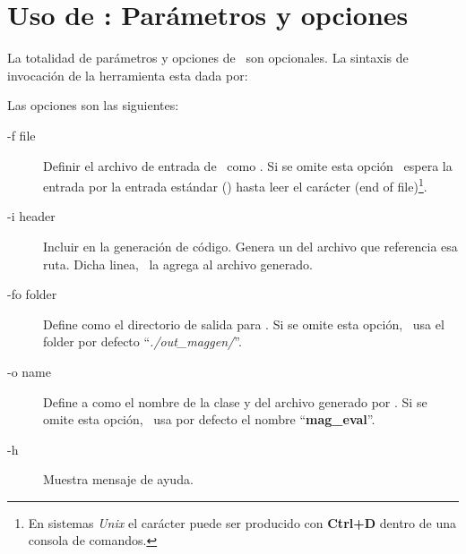 \section{Uso de \maggen: Parámetros y opciones}
\label{sec:uso-maggen}
La totalidad de parámetros y opciones de \maggen\ son opcionales. La sintaxis de invocación de la herramienta esta dada por:\\
\begin{center}\end{center}
Las opciones son las siguientes:

\begin{description}
\item [-f  file] Definir el archivo de entrada de \maggen\ como . Si se omite esta opción \maggen\ espera la entrada por la entrada estándar () hasta leer el carácter  (end of file)\footnote{En sistemas \textit{Unix} el carácter  puede ser producido con \textbf{Ctrl+D} dentro de una consola de comandos.}.

\item [-i  header] Incluir  en la generación de código. Genera un  del archivo que referencia esa ruta. Dicha linea, \maggen\ la agrega al archivo generado.

\item [-fo folder] Define  como el directorio de salida para \maggen. Si se omite esta opción, \maggen\ usa el folder por defecto ``\textit{./out\_maggen/}''.

\item [-o  name] Define a  como el nombre de la clase y del archivo generado por \maggen. Si se omite esta opción, \maggen\ usa por defecto el nombre ``\textbf{mag\_eval}''.

\item [-h] Muestra mensaje de ayuda.
\end{description}

